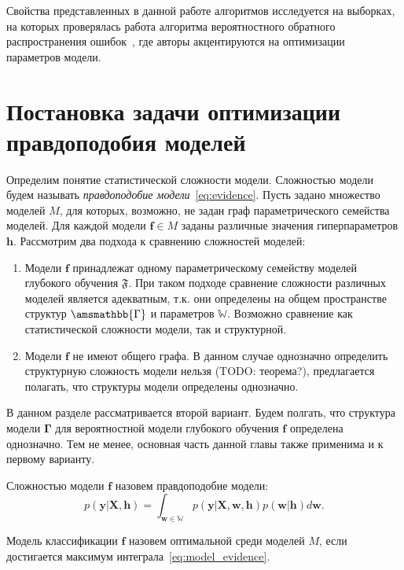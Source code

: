Свойства представленных в данной работе  алгоритмов исследуется на выборках, на которых проверялась работа алгоритма вероятностного обратного распространения ошибок~\cite{pbp}, где авторы акцентируются на оптимизации параметров модели. 


\section{Постановка задачи оптимизации правдоподобия моделей}
Определим понятие статистической сложности модели. Сложностью модели будем называть \textit{правдоподобие модели}~\eqref{eq:evidence}.
Пусть задано множество моделей $M$, для которых, возможно, не задан граф параметрического семейства моделей.
Для каждой модели $\mathbf{f} \in {M}$ заданы различные значения гиперпараметров $\mathbf{h}$. 
Рассмотрим два подхода к сравнению сложностей моделей:
\begin{enumerate}
\item Модели $\mathbf{f}$ принадлежат одному параметрическому семейству моделей глубокого обучения $\mathfrak{F}$. При таком подходе сравнение сложности различных моделей является  адекватным, т.к. они определены на общем пространстве структур $\amsmathbb{\Gamma}$ и параметров $\mathbb{W}$. Возможно сравнение как статистической сложности модели, так и структурной.
\item Модели $\mathbf{f}$  не имеют общего графа. В данном случае однозначно определить структурную сложность модели нельзя (TODO: теорема?), предлагается полагать, что структуры модели определены однозначно.
\end{enumerate}
В данном разделе рассматривается второй вариант. Будем полгать, что структура модели $\boldsymbol{\Gamma}$ для вероятностной модели глубокого обучения $\mathbf{f}$ определена однозначно. Тем не менее, основная часть данной главы также применима и к первому варианту.

\begin{defin} Сложностью модели $\mathbf{f}$ назовем правдоподобие модели:
\begin{equation}
\label{eq:model_evidence}
	p(\mathbf{y}|\mathbf{X},\mathbf{h}) = \int_{\mathbf{w} \in \mathbb{W}} p(\mathbf{y}|\mathbf{X},\mathbf{w}, \mathbf{h})p(\mathbf{w}|\mathbf{h})d\mathbf{w}.
\end{equation}
\end{defin}


\begin{defin}Модель классификации $\mathbf{f}$ назовем оптимальной среди моделей $M$, если достигается максимум интеграла~\eqref{eq:model_evidence}.
\end{defin}


